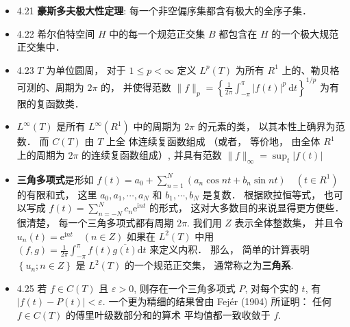 \begin{itemize}
\item 4.21 \textbf{豪斯多夫极大性定理}: 每一个非空偏序集都含有极大的全序子集．

\item 4.22 希尔伯特空间 $H$ 中的每一个规范正交集 $B$ 都包含在 $H$ 的一个极大规范正交集中．

\item 4.23 $T$ 为单位圆周， 对于 $1 \leqslant p<\infty$ 定义 $L^{p}(T)$ 为所有 $R^{1}$ 上的、勒贝格可测的、周期为 $2 \pi$ 的， 并使得范数 $\|f\|_{p}=\left\{\frac{1}{2 \pi} \int_{-\pi}^{\pi}|f(t)|^{p} \mathrm{~d} t\right\}^{1 / p}$ 为有限的复函数类．

\item $L^{\infty}(T)$ 是所有 $L^{\infty}\left(R^{1}\right)$ 中的周期为 $2 \pi$ 的元素的类， 以其本性上确界为范数． 而 $C(T)$ 由 $T$ 上全 体连续复函数组成 （或者， 等价地， 由全体 $R^{1}$ 上的周期为 $2 \pi$ 的连续复函数组成）, 并具有范数 $\|f\|_{\infty}=\sup _{t}|f(t)|$

\item \textbf{三角多项式}是形如 $f(t)=a_{0}+\sum_{n=1}^{N}\left(a_{n} \cos n t+b_{n} \sin n t\right) \quad\left(t \in R^{1}\right)$ 的有限和式， 这里 $a_{0}, a_{1}, \cdots, a_{N}$ 和 $b_{1}, \cdots, b_{N}$ 是复数． 根据欧拉恒等式， 也可以写成 $f(t)=\sum_{n=-N}^{N} c_{n} \mathrm{e}^{\mathrm{i} n t}$ 的形式， 这对大多数目的来说显得更方便些． 很清楚， 每一个三角多项式都有周期 $2 \pi$. 我们用 $Z$ 表示全体整数集， 并且令 $u_{n}(t)=\mathrm{e}^{\mathrm{i} n t} \quad(n \in Z)$ 如果在 $L^{2}(T)$ 中用 $(f, g)=\frac{1}{2 \pi} \int_{-\pi}^{\pi} f(t) \overline{g(t)} \mathrm{d} t$ 来定义内积． 那么， 简单的计算表明 $\left\{u_{n} ; n \in Z\right\}$ 是 $L^{2}(T)$ 的一个规范正交集， 通常称之为\textbf{三角系}.

\item 4.25 若 $f \in C(T)$ 且 $\varepsilon>0$, 则存在一个三角多项式 $P$, 对每个实的 $t$, 有 $|f(t)-P(t)|<\varepsilon$. 一个更为精细的结果曾由 Fejér (1904) 所证明： 任何 $f \in C(T)$ 的傅里叶级数部分和的算术 平均值都一致收敛于 $f$.


\end{itemize}
